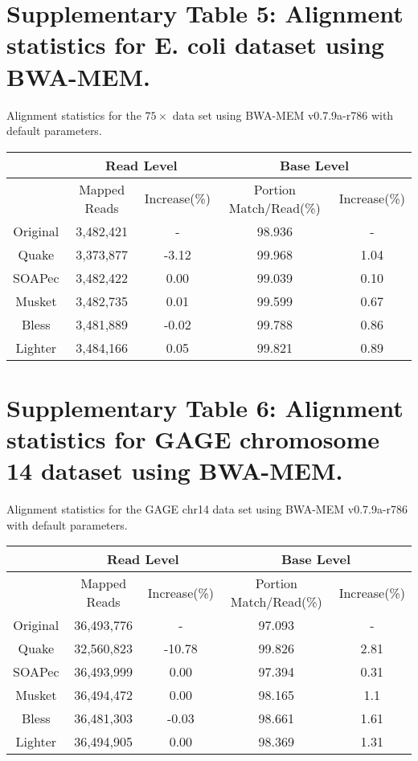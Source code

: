 \documentclass[10pt]{article}
\begin{document}
\section*{Supplementary Table 5: Alignment statistics for E. coli dataset using BWA-MEM.}

\noindent Alignment statistics for the $75\times$ \ecoli data set using BWA-MEM \cite{li2013aligning} v0.7.9a-r786 with default parameters.

\begin{table}[h!] 
\begin{tabular}{|c|c|c||c|c|} \hline
	 & \multicolumn{2}{|c||}{Read Level} & \multicolumn{2}{|c|}{Base Level} \\ \hline
     & Mapped Reads & Increase(\%) & Portion Match/Read(\%)  & Increase(\%) \\ \hline
Original&	3,482,421&	-&	98.936 & - \\ \hline
Quake&	3,373,877&	-3.12&	99.968 & 1.04 \\ \hline
SOAPec&	3,482,422&	0.00&	99.039 & 0.10 \\ \hline
Musket&	3,482,735&	0.01&	99.599 & 0.67 \\ \hline
Bless&	3,481,889&	-0.02&	99.788 & 0.86 \\ \hline
Lighter&	3,484,166&	0.05&	99.821 & 0.89 \\ \hline
\end{tabular}
\end{table}
\clearpage

\section*{Supplementary Table 6: Alignment statistics for GAGE chromosome 14 dataset using BWA-MEM.}

\noindent Alignment statistics for the GAGE chr14 data set using BWA-MEM \cite{li2013aligning} v0.7.9a-r786 with default parameters.

\begin{table}[h!]
\begin{tabular}{|c|c|c||c|c|} \hline
	 & \multicolumn{2}{|c||}{Read Level} & \multicolumn{2}{|c|}{Base Level} \\ \hline
     & Mapped Reads & Increase(\%) &  Portion Match/Read(\%) & Increase(\%) \\ \hline
Original&	36,493,776& - 	& 97.093 & - \\ \hline
Quake&	32,560,823&	-10.78&	99.826 & 2.81 \\ \hline
SOAPec&	36,493,999&	0.00&	97.394 & 0.31 \\ \hline
Musket&	36,494,472&	0.00&	98.165 & 1.1 \\ \hline
Bless&	36,481,303&	-0.03&	98.661 & 1.61 \\ \hline
Lighter&	36,494,905&	0.00& 98.369 & 1.31 \\ \hline
\end{tabular}
\end{table}

\clearpage



\end{document}
